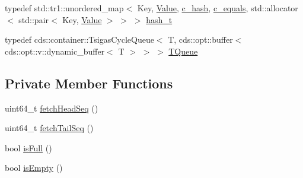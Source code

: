 \begin{DoxyCompactItemize}
\item 
typedef std\+::tr1\+::unordered\+\_\+map$<$ Key, \hyperlink{hash__map_2test_object_8h_ad777bf08d8e2b01df17ba5e3c51ae11f}{Value}, \hyperlink{class_test_class_ac0d14c72d1a7e359213955041bd3eea5}{c\+\_\+hash}, \hyperlink{class_test_class_aafbd6570cd1aa88768f912c15ca188b5}{c\+\_\+equals}, std\+::allocator$<$ std\+::pair$<$ Key, \hyperlink{hash__map_2test_object_8h_ad777bf08d8e2b01df17ba5e3c51ae11f}{Value} $>$ $>$ $>$ \hyperlink{class_test_class_a8fb58a1993096d04900e63c7901dbe75}{hash\+\_\+t}
\item 
typedef cds\+::container\+::\+Tsigas\+Cycle\+Queue$<$ T, cds\+::opt\+::buffer$<$ cds\+::opt\+::v\+::dynamic\+\_\+buffer$<$ T $>$ $>$ $>$ \hyperlink{class_test_class_ae96e169a6dee97fddd6acfc655497f0c}{T\+Queue}
\end{DoxyCompactItemize}
\subsection*{Private Member Functions}
\begin{DoxyCompactItemize}
\item 
uint64\+\_\+t \hyperlink{class_test_class_ab545dba6b104cb162aed9d6fd893d3c8}{fetch\+Head\+Seq} ()
\item 
uint64\+\_\+t \hyperlink{class_test_class_a29a38598a9e07d80cbcf712ae9634185}{fetch\+Tail\+Seq} ()
\item 
bool \hyperlink{class_test_class_af8f565d4f1733a92b02b903e882210de}{is\+Full} ()
\item 
bool \hyperlink{class_test_class_abb48ce9bd10e18e6362e66ced3af0200}{is\+Empty} ()
\end{DoxyCompactItemize}
